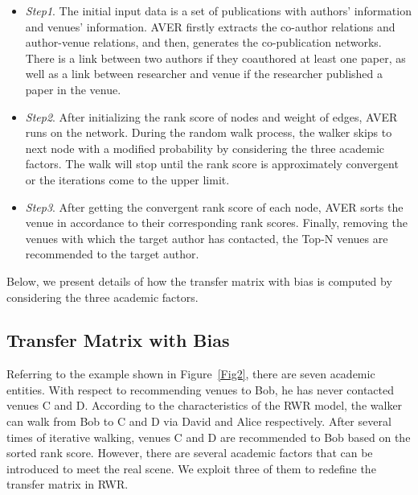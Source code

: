 \documentclass{sig-alternate-2013}
\begin{document}
\begin{itemize}
  \item \emph{Step1}. The initial input data is a set of publications with authors' information and venues' information. AVER firstly extracts the co-author relations and author-venue relations, and then, generates the co-publication networks. There is a link between two authors if they coauthored at least one paper, as well as a link between researcher and venue if the researcher published a paper in the venue.
  \item \emph{Step2}. After initializing the rank score of nodes and weight of edges, AVER runs on the network. During the random walk process, the walker skips to next node with a modified probability by considering the three academic factors. The walk will stop until the rank score is approximately convergent or the iterations come to the upper limit.
  \item \emph{Step3}. After getting the convergent rank score of each node, AVER sorts the venue in accordance to their corresponding rank scores. Finally, removing the venues with which the target author has contacted, the Top-N venues are recommended to the target author.
\end{itemize}

Below, we present details of how the transfer matrix with bias is computed by considering the three academic factors.

\subsection{Transfer Matrix with Bias}
Referring to the example shown in Figure~\ref{Fig2}, there are seven academic entities. With respect to recommending venues to Bob, he has never contacted venues C and D. According to the characteristics of the RWR model, the walker can walk from Bob to C and D via David and Alice respectively. After several times of iterative walking, venues C and D are recommended to Bob based on the sorted rank score. However, there are several academic factors that can be introduced to meet the real scene. We exploit three of them to redefine the transfer matrix in RWR.
\end{document}
